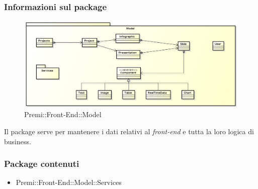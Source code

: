 	\subsubsection{Informazioni sul package}
		\begin{figure}[h]
			\centering
			\includegraphics[width=0.7\linewidth]{img/front-end-package_model}
			\caption[Premi::Front-End::Model]{Premi::Front-End::Model}
		\end{figure}
		Il package serve per mantenere i dati relativi al \textit{front-end} e tutta la loro logica di business.
	\subsubsection{Package contenuti}
		\begin{itemize}
		 \item Premi::Front-End::Model::Services
		\end{itemize}
